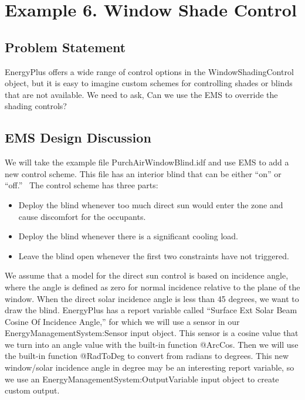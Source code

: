 \section{Example 6. Window Shade Control}\label{example-6.-window-shade-control}

\subsection{Problem Statement}\label{problem-statement-008}

EnergyPlus offers a wide range of control options in the WindowShadingControl object, but it is easy to imagine custom schemes for controlling shades or blinds that are not available. We need to ask, Can we use the EMS to override the shading controls?

\subsection{EMS Design Discussion}\label{ems-design-discussion-008}

We will take the example file PurchAirWindowBlind.idf and use EMS to add a new control scheme. This file has an interior blind that can be either ``on'' or ``off.''~ The control scheme has three parts:

\begin{itemize}
\item
  Deploy the blind whenever too much direct sun would enter the zone and cause discomfort for the occupants.
\item
  Deploy the blind whenever there is a significant cooling load.
\item
  Leave the blind open whenever the first two constraints have not triggered.
\end{itemize}

We assume that a model for the direct sun control is based on incidence angle, where the angle is defined as zero for normal incidence relative to the plane of the window. When the direct solar incidence angle is less than 45 degrees, we want to draw the blind. EnergyPlus has a report variable called ``Surface Ext Solar Beam Cosine Of Incidence Angle,'' for which we will use a sensor in our EnergyManagementSystem:Sensor input object. This sensor is a cosine value that we turn into an angle value with the built-in function @ArcCos. Then we will use the built-in function @RadToDeg to convert from radians to degrees. This new window/solar incidence angle in degree may be an interesting report variable, so we use an EnergyManagementSystem:OutputVariable input object to create custom output.

